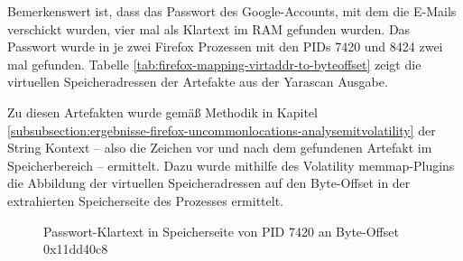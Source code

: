 Bemerkenswert ist, dass das Passwort des Google-Accounts, mit dem die E-Mails verschickt wurden, vier mal als Klartext im RAM gefunden wurden. Das Passwort wurde in je zwei Firefox Prozessen mit den PIDs 7420 und 8424 zwei mal gefunden. Tabelle \ref{tab:firefox-mapping-virtaddr-to-byteoffset} zeigt die virtuellen Speicheradressen der Artefakte aus der Yarascan Ausgabe.
\begin{table}[]
\label{tab:firefox-mapping-virtaddr-to-byteoffset}
\caption{Abbildung der virtellen Speicheradressen der gefundenen Strings auf Byte-Offsets der entsprechenden Speicherseiten}
\end{table}

Zu diesen Artefakten wurde gemäß Methodik in Kapitel \ref{subsubsection:ergebnisse-firefox-uncommonlocations-analysemitvolatility} der String Kontext -- also die Zeichen vor und nach dem gefundenen Artefakt im Speicherbereich -- ermittelt. Dazu wurde mithilfe des Volatility memmap-Plugins die Abbildung der virtuellen Speicheradressen auf den Byte-Offset in der extrahierten Speicherseite des Prozesses ermittelt. 
\begin{figure}[h!]
	\centerline{}
	\label{img:firefox-pw-offset-0x11dd40c8}  
	\caption{Passwort-Klartext in Speicherseite von PID 7420 an Byte-Offset 0x11dd40c8}
\end{figure}

